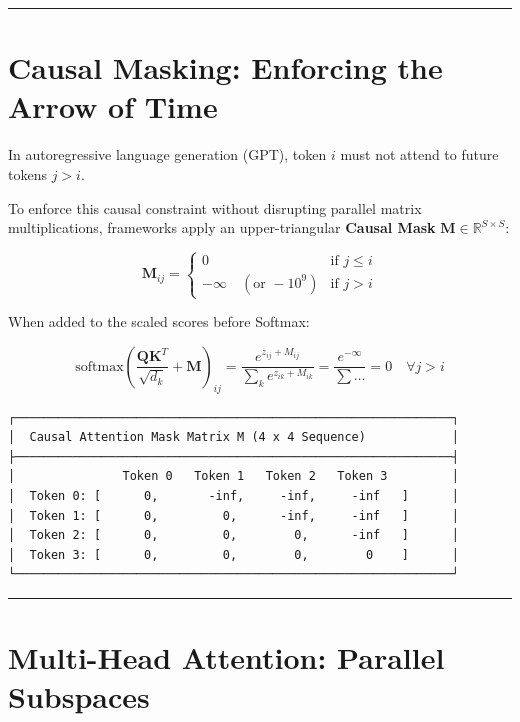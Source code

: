 \documentclass[
  letterpaper,
]{scrbook}
\begin{document}
\begin{center}\rule{0.5\linewidth}{0.5pt}\end{center}

\section{Causal Masking: Enforcing the Arrow of
Time}\label{causal-masking-enforcing-the-arrow-of-time}

In autoregressive language generation (GPT), token \(i\) must not attend
to future tokens \(j > i\).

To enforce this causal constraint without disrupting parallel matrix
multiplications, frameworks apply an upper-triangular \textbf{Causal
Mask} \(\mathbf{M} \in \mathbb{R}^{S \times S}\):

\[\mathbf{M}_{ij} = \begin{cases} 0 & \text{if } j \le i \\ -\infty \quad (\text{or } -10^9) & \text{if } j > i \end{cases}\]

When added to the scaled scores before Softmax:

\[\text{softmax}\left( \frac{\mathbf{Q} \mathbf{K}^T}{\sqrt{d_k}} + \mathbf{M} \right)_{ij} = \frac{e^{z_{ij} + M_{ij}}}{\sum_k e^{z_{ik} + M_{ik}}} = \frac{e^{-\infty}}{\sum \dots} = 0 \quad \forall j > i\]

\begin{verbatim}
┌─────────────────────────────────────────────────────────────┐
│  Causal Attention Mask Matrix M (4 x 4 Sequence)            │
├─────────────────────────────────────────────────────────────┤
│               Token 0   Token 1   Token 2   Token 3         │
│  Token 0: [      0,       -inf,     -inf,     -inf   ]      │
│  Token 1: [      0,         0,      -inf,     -inf   ]      │
│  Token 2: [      0,         0,        0,      -inf   ]      │
│  Token 3: [      0,         0,        0,        0    ]      │
└─────────────────────────────────────────────────────────────┘
\end{verbatim}

\begin{center}\rule{0.5\linewidth}{0.5pt}\end{center}

\section{Multi-Head Attention: Parallel
Subspaces}\label{multi-head-attention-parallel-subspaces}
\end{document}
